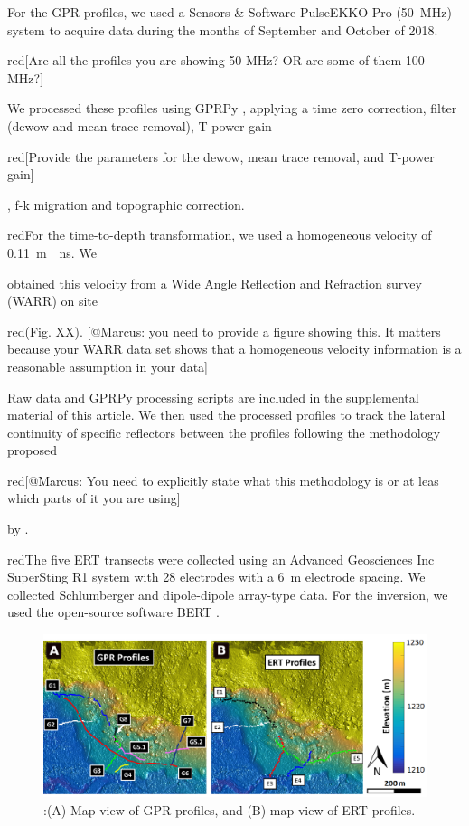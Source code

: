 \documentclass[utf8]{frontiersSCNS}
\newcommand{\alon}{\begin{color}{red}}
\newcommand{\aloff}{\end{color}}
\begin{document}
For the GPR profiles, we used a Sensors \& Software PulseEKKO Pro (\SI{50}{\mega Hz}) system to acquire data during the months of September and October of 2018. \alon [Are all the profiles you are showing 50 MHz? OR are some of them 100 MHz?] \aloff We processed these profiles using GPRPy \citep{plattner2019comunity,Plattner2019}, applying a time zero correction, filter (dewow and mean trace removal), T-power gain \alon [Provide the parameters for the dewow, mean trace removal, and T-power gain] \aloff, f-k migration \citep{stolt1978migration} and topographic correction. \alon For the time-to-depth transformation, we used a homogeneous velocity of \SI{0.11}{m \per ns}. We \aloff obtained this velocity from a Wide Angle Reflection and Refraction survey (WARR) on site \alon(Fig. XX). [@Marcus: you need to provide a figure showing this. It matters because your WARR data set shows that a homogeneous velocity information is a reasonable assumption in your data]\aloff Raw data and GPRPy processing scripts are included in the supplemental material of this article. We then used the processed profiles to track the lateral continuity of specific reflectors between the profiles following the methodology proposed \alon [@Marcus: You need to explicitly state what this methodology is or at leas which parts of it you are using] \aloff by \citep{mitchum1977seismic}.

\alon The five ERT transects were collected using an Advanced Geosciences Inc SuperSting R1 system with 28 electrodes with a \SI{6}{m} electrode spacing. We collected Schlumberger and dipole-dipole array-type data. For the inversion, we used the open-source software BERT \cite[][]{gunther2006three,Ruecker2017}. \aloff


								 \begin{figure}[h]

	\includegraphics[width=\textwidth]{Figures/GPR_ERT_Map.pdf}
		\caption{:(A) Map view of GPR profiles, and (B) map view of ERT profiles. \label{GPR_ERT_Map}}

								   \end{figure}
\end{document}
